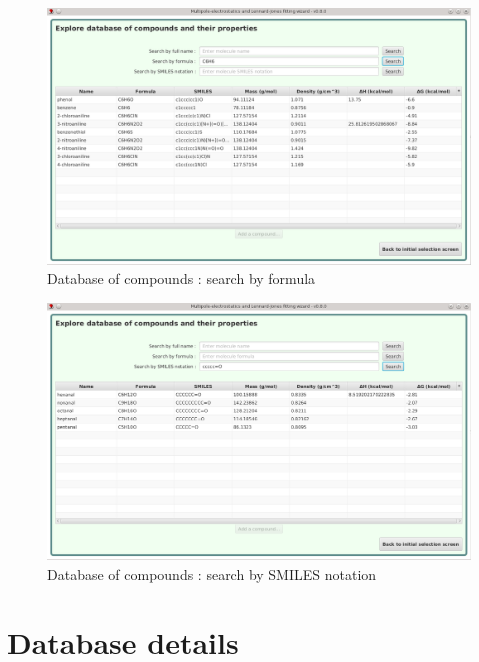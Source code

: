 \documentclass[12pt,a4paper]{article}
\begin{document}
\begin{figure}[h!]
\centering
\includegraphics[width=0.9\linewidth]{pics/scr13}
\caption{Database of compounds : search by formula}
\label{fig13}
\end{figure}

\begin{figure}[h!]
\centering
\includegraphics[width=0.9\linewidth]{pics/scr14}
\caption{Database of compounds : search by SMILES notation}
\label{fig14}
\end{figure}

\clearpage


%


\section{Database details}
\end{document}
